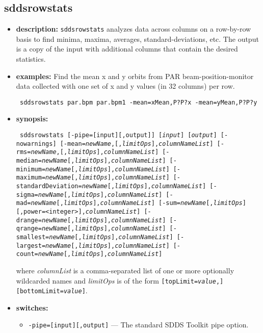 \begin{latexonly}
\newpage
\end{latexonly}
\subsection{sddsrowstats}
\label{sddsrowstats}

\begin{itemize}
\item {\bf description:}
{\tt sddsrowstats} analyzes data across columns on a row-by-row basis to
find minima, maxima, averages, standard-deviations, etc.
The output is a copy of the input with additional columns that contain
the desired statistics.
\item {\bf examples:}
Find the mean x and y orbits from PAR beam-position-monitor data collected
with one set of x and y values (in 32 columns) per row.
\begin{flushleft}{\tt
sddsrowstats par.bpm par.bpm1 -mean=xMean,P?P?x -mean=yMean,P?P?y
}\end{flushleft}
\item {\bf synopsis:}
\begin{flushleft}{\tt
sddsrowstats [-pipe=[input][,output]] [{\em input}] [{\em output}] 
[-nowarnings]
[-mean={\em newName},[,{\em limitOps}],{\em columnNameList}]
[-rms={\em newName},[,{\em limitOps}],{\em columnNameList}]
[-median={\em newName}[,{\em limitOps}],{\em columnNameList}]
[-minimum={\em newName}[,{\em limitOps}],{\em columnNameList}]
[-maximum={\em newName}[,{\em limitOps}],{\em columnNameList}]
[-standardDeviation={\em newName}[,{\em limitOps}],{\em columnNameList}]
[-sigma={\em newName}[,{\em limitOps}],{\em columnNameList}]
[-mad={\em newName}[,{\em limitOps}],{\em columnNameList}]
[-sum={\em newName}[,{\em limitOps}][,power=<integer>],{\em columnNameList}] 
[-drange={\em newName}[,{\em limitOps}],{\em columnNameList}]
[-qrange={\em newName}[,{\em limitOps}],{\em columnNameList}]
[-smallest={\em newName}[,{\em limitOps}],{\em columnNameList}]
[-largest={\em newName}[,{\em limitOps}],{\em columnNameList}]
[-count={\em newName}[,{\em limitOps}],{\em columnNameList}]
}\end{flushleft}
where {\em columnList} is a comma-separated list of one or more optionally wildcarded names and
{\em limitOps} is of the form {\tt [topLimit={\em value},][bottomLimit={\em value}]}.
\item {\bf switches:}
    \begin{itemize}
    \item {\tt -pipe=[input][,output]} --- The standard SDDS Toolkit pipe option.

\end{itemize}
\end{itemize}
